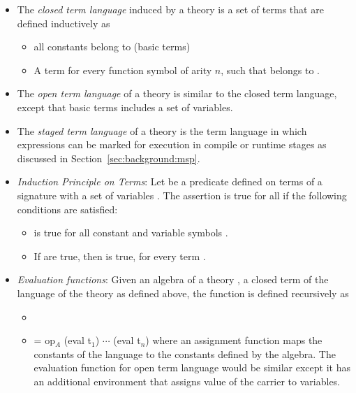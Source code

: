 \begin{itemize}
   \item The \emph{closed term language}  induced by a theory is a set of terms that are defined inductively as 
    \begin{itemize}
        \item all constants belong to  (basic terms) 
        \item A term  for every function symbol  of arity $n$, such that   belongs to . 
    \end{itemize}
    \item The \emph{open term language} of a theory is similar to the closed term language, except that basic terms includes a set of variables.  
    \item The \emph{staged term language} of a theory is the term language in which expressions can be marked for execution in compile or runtime stages as discussed in Section~\ref{sec:background:msp}.  
    \item \emph{Induction Principle on Terms}: Let  be a predicate defined on terms  of a signature  with a set of variables . The assertion  is true for all  if the following conditions are satisfied: 
    \begin{itemize}
        \item {} is true for all constant and variable symbols .
        \item If  are true, then  is true, for every term .  
    \end{itemize}     
    \item \emph{Evaluation functions}: Given an algebra  of a theory \lstmath{$\Gamma = (\sort,\fsyms,\equations$)}, a closed term of the language of the theory as defined above, the function  is defined recursively as 
    \begin{itemize}
        \item {}
        \item {} = op$_A$ (eval t$_1$) $\cdots$ (eval t$_n$) where an assignment function maps the constants of the language to the constants defined by the algebra. The evaluation function for open term language would be similar except it has an additional environment that assigns value of the carrier to variables. 

\end{itemize}
\end{itemize}
